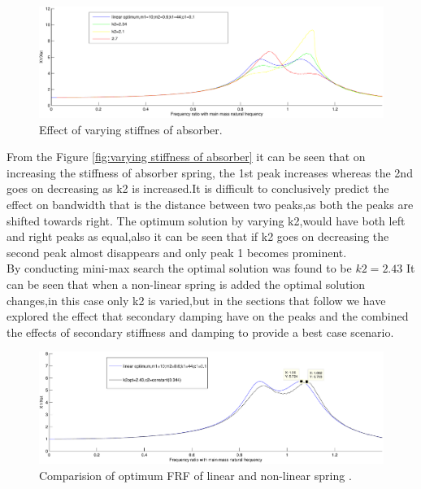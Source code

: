 \begin{figure}[h!]
\includegraphics[width=\textwidth,height=0.5\textwidth]{"figures/nonlinearity_primaryymass_3_effect of secondaryspring"}
  \caption{Effect of varying stiffnes of absorber.}
  \label{fig:varying stiffnes of absorber}
  \end{figure}
From the Figure \ref{fig:varying stiffness of absorber} it can be seen that on increasing the stiffness of absorber spring, the 1st peak increases whereas the 2nd  goes on decreasing as k2 is increased.It is difficult to conclusively predict the effect on bandwidth that is the distance between two peaks,as both the peaks are shifted towards right.
The optimum solution by varying k2,would have both left and right peaks as equal,also it can be seen that if k2 goes on decreasing the second peak almost disappears and only peak 1 becomes prominent.\\
By conducting mini-max search the optimal solution was found to be $k2=2.43$ It can be seen that when a non-linear spring is added the optimal solution changes,in this case only k2 is varied,but in the sections that follow we have explored the effect that secondary damping have on the peaks and the combined the effects of secondary stiffness and damping to provide a best case scenario.\\
  

\begin{figure}[h!]
  \includegraphics[width=\textwidth,height=0.5\textwidth]{"figures/nonlinearity_primaryymass_3b_effect of secondaryspring_only optimums"}
  \caption{Comparision of optimum FRF of linear and non-linear spring .}
  \label{fig:optimum stiffness}
\end{figure}

